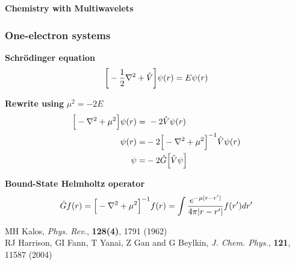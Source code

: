 \begin{frame}
  \centering
  \textbf{\Large{Chemistry with Multiwavelets}}
\end{frame}

\begin{frame}
  \frametitle{One-electron systems}
  \centering
  \textbf{Schr\"{o}dinger equation}
  \begin{equation}
    \bigg[-\frac{1}{2}\nabla^2 + \hat{V}\bigg]\psi(r) = E \psi(r)
  \end{equation}

  \vspace{5mm}

  \textbf{Rewrite using} $\mu^2 = -2E$
  \begin{align}
    \Big[-\nabla^2 + \mu^2\Big]\psi(r) =&\ -2 \hat{V} \psi(r)\\
    \psi(r) =&-2\Big[-\nabla^2 + \mu^2\Big]^{-1} \hat{V} \psi(r)\\
    \psi =&-2\hat{G}\Big[\hat{V} \psi\Big]
  \end{align}

  \vspace{5mm}

  \textbf{Bound-State Helmholtz operator}
  \begin{equation}
    \hat{G} f(r) = \Big[-\nabla^2 + \mu^2\Big]^{-1} f(r) = \int \frac{e^{-\mu |r-r'|}}{4\pi|r-r'|}f(r')dr'
  \end{equation}

  \vspace{5mm}

  \centering
  \tiny
  MH Kalos,
  {\it Phys. Rev.},
  \textbf{128(4)},
  1791 (1962)\\
  RJ Harrison, GI Fann, T Yanai, Z Gan and G Beylkin,
  {\it J. Chem. Phys.},
  \textbf{121},
  11587 (2004)
\end{frame}

